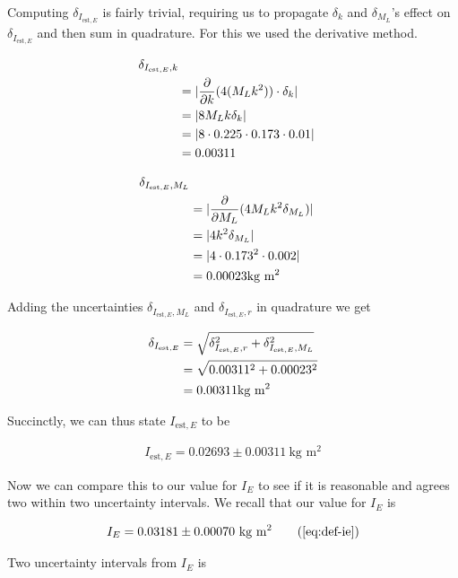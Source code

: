 \documentclass[coverpage]{article}
\newcommand{\iUnit}{\text{kg $\text{m}^2$}}
\begin{document}
	Computing $\delta_{I_{\text{est}, E}}$ is fairly trivial, requiring us to propagate $\delta_k$ and $\delta_{M_L}$'s effect on $\delta_{I_{\text{est}, E}}$ and then sum in quadrature. For this we used the derivative method.
	
	\begin{align}
		\delta_{I_{\text{est}, E}, k} \notag \\
		&= |\frac{\partial}{\partial k} (4 (M_L k^2)) \cdot \delta_k| \notag \\
		&= |8 M_L k \delta_k| \notag \\
		&= |8 \cdot 0.225 \cdot 0.173 \cdot 0.01| \notag \\
		&= 0.00311
	\end{align}
	
	\begin{align}
		\delta_{I_{\text{est}, E}, M_L} \notag \\
		&= |\frac{\partial}{\partial M_L} (4 M_L k^2 \delta_{M_L})| \notag \\
		&= |4 k^2 \delta_{M_L}| \notag \\
		&= |4 \cdot 0.173^2 \cdot 0.002| \notag \\
		&= 0.00023 \iUnit
	\end{align}
	
	Adding the uncertainties $\delta_{I_{\text{est}, E}, M_L}$ and $\delta_{I_{\text{est}, E}, r}$ in quadrature we get
	
	\begin{align}
		\delta_{I_{\text{est}, E}} &= \sqrt{\delta_{I_{\text{est}, E}, r}^2 + \delta_{I_{\text{est}, E}, M_L}^2} \notag \\
		&= \sqrt{0.00311^2 + 0.00023^2} \notag \\
		&= 0.00311 \iUnit
	\end{align}

	Succinctly, we can thus state $I_{\text{est}, E}$ to be
	
	\begin{align}
		I_{\text{est}, E} = 0.02693 \pm 0.00311\ \iUnit
	\end{align}

	Now we can compare this to our value for $I_E$ to see if it is reasonable and agrees two within two uncertainty intervals. We recall that our value for $I_E$ is
	
	\begin{align}
		I_E = 0.03181 \pm 0.00070\ \iUnit \tag{\ref{eq:def-ie}}
	\end{align} 

	Two uncertainty intervals from $I_E$ is
	
\end{document}
